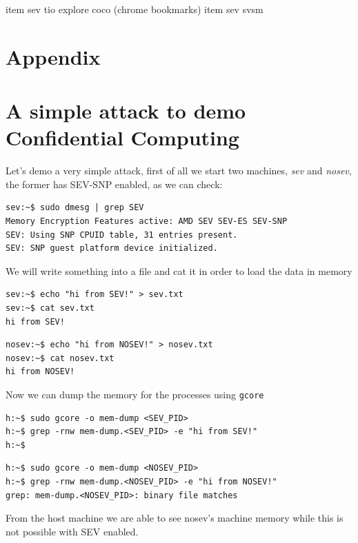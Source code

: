\documentclass[twocolumn]{article}
\begin{document}
item sev tio 
explore coco (chrome bookmarks)
item sev svsm

\printbibliography
\appendix
\section*{Appendix}
\section{A simple attack to demo Confidential Computing}
Let's demo a very simple attack, first of all we start two machines, \textit{sev} and \textit{nosev}, the former has SEV-SNP enabled, as we can check:

\begin{verbatim}
sev:~$ sudo dmesg | grep SEV
Memory Encryption Features active: AMD SEV SEV-ES SEV-SNP
SEV: Using SNP CPUID table, 31 entries present.
SEV: SNP guest platform device initialized.
\end{verbatim}

We will write something into a file and cat it in order to load the data in memory

\begin{verbatim}
sev:~$ echo "hi from SEV!" > sev.txt
sev:~$ cat sev.txt
hi from SEV!
\end{verbatim}

\begin{verbatim}
nosev:~$ echo "hi from NOSEV!" > nosev.txt
nosev:~$ cat nosev.txt
hi from NOSEV!
\end{verbatim}

Now we can dump the memory for the processes using \texttt{gcore}

\begin{verbatim}
h:~$ sudo gcore -o mem-dump <SEV_PID>
h:~$ grep -rnw mem-dump.<SEV_PID> -e "hi from SEV!"
h:~$
\end{verbatim}

\begin{verbatim}
h:~$ sudo gcore -o mem-dump <NOSEV_PID>
h:~$ grep -rnw mem-dump.<NOSEV_PID> -e "hi from NOSEV!"
grep: mem-dump.<NOSEV_PID>: binary file matches
\end{verbatim}

From the host machine we are able to see nosev's machine memory while this is not possible with SEV enabled.
\end{document}
